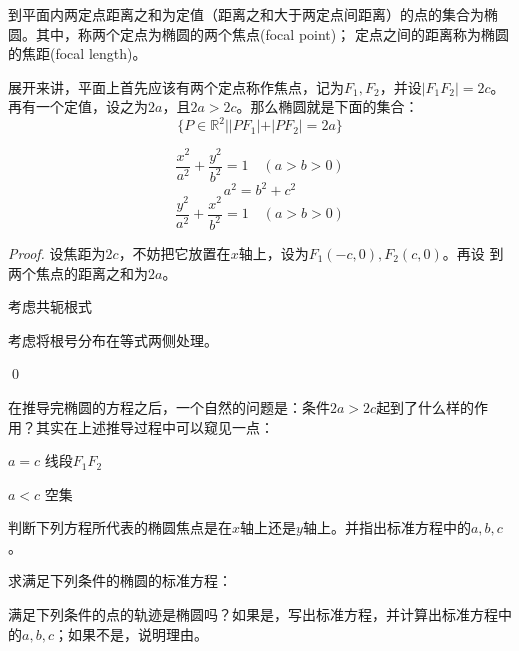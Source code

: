\begin{definition}[椭圆的第一定义]
    到平面内两定点距离之和为定值（距离之和大于两定点间距离）的点的集合为椭圆。其中，称两个定点为椭圆的两个焦点(focal point)；
    定点之间的距离称为椭圆的焦距(focal length)。
\end{definition}
展开来讲，平面上首先应该有两个定点称作焦点，记为\(F_1,F_2\)，并设\(|F_1F_2|=2c\)。
再有一个定值，设之为\(2a\)，且\(2a>2c\)。那么椭圆就是下面的集合：
\[\{P\in \mathbb{R}^2||PF_1|+|PF_2|=2a\}\]
\begin{theorem}[椭圆的标准方程]
    \begin{equation}
        \frac{x^2}{a^2}+\frac{y^2}{b^2}=1 \quad (a>b>0)
    \end{equation}
    \begin{equation}
        a^2=b^2+c^2
    \end{equation}
    \begin{equation}
        \frac{y^2}{a^2}+\frac{x^2}{b^2}=1 \quad (a>b>0)
    \end{equation}
\end{theorem}
\begin{proof}
    设焦距为\(2c\)，不妨把它放置在\(x\)轴上，设为\(F_1(-c,0), F_2(c,0)\)。再设
    到两个焦点的距离之和为\(2a\)。
    \begin{way1}考虑共轭根式
        
    \end{way1}

    \begin{way2}考虑将根号分布在等式两侧处理。
        
    \end{way2}
    \qed
\end{proof}
在推导完椭圆的方程之后，一个自然的问题是：条件\(2a>2c\)起到了什么样的作用？其实在上述推导过程中可以窥见一点：
\begin{corollary}
    \(a=c\) 线段\(F_1F_2\)

    \(a<c\) 空集
\end{corollary}
\begin{example}
    判断下列方程所代表的椭圆焦点是在\(x\)轴上还是\(y\)轴上。并指出标准方程中的\(a,b,c\)。
\end{example}
\begin{example}
    求满足下列条件的椭圆的标准方程：
\end{example}
\begin{exercise}
    满足下列条件的点的轨迹是椭圆吗？如果是，写出标准方程，并计算出标准方程中的\(a,b,c\)；如果不是，说明理由。
\end{exercise}

